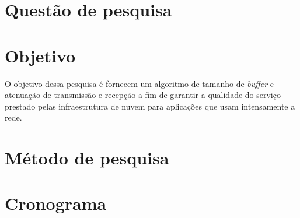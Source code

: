 \section{Questão de pesquisa}


\section{Objetivo}
O objetivo dessa pesquisa é fornecem um algoritmo de tamanho de \textit{buffer} e atenuação de transmissão e recepção a fim de garantir a qualidade do serviço prestado pelas infraestrutura de nuvem para aplicações que usam intensamente a rede.

\section{Método de pesquisa}

\section{Cronograma}
